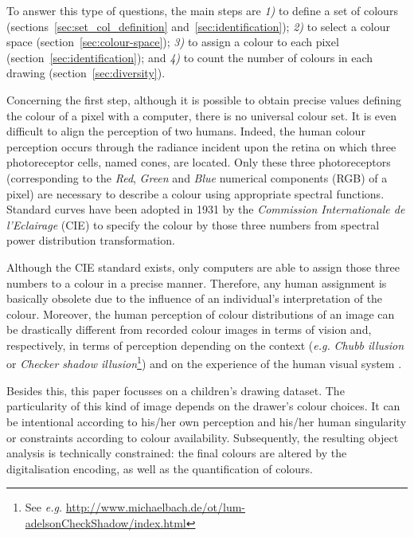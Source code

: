 \documentclass[11pt,a4paper]{article}
\begin{document}
To answer this type of questions, the main steps are \textit{1)} to define a set of colours 
(sections~\ref{sec:set_col_definition} and~\ref{sec:identification}); \textit{2)} to select a colour space (section~\ref{sec:colour-space}); \textit{3)} to assign a colour to each pixel (section~\ref{sec:identification}); and \textit{4)} to count the number of colours in each drawing (section~\ref{sec:diversity}).

Concerning the first step, although it is possible to obtain precise values defining the colour of a pixel with a computer, there is no universal colour set.
It is even difficult to align the perception of two humans.
Indeed, the human colour perception occurs through the radiance incident upon
the retina on which three photoreceptor cells, named cones, are located.
Only these three photoreceptors (corresponding to the \emph{Red}, \emph{Green} and \emph{Blue} numerical components (RGB) of a pixel) are necessary to describe a colour using appropriate spectral functions. Standard curves have been adopted in 1931 by the \textit{Commission Internationale de l'Eclairage} (CIE) to specify the colour by those three numbers from spectral power distribution transformation.

Although the CIE standard exists, only computers are able to assign
those three numbers to a colour in a precise manner. Therefore, any
human assignment is basically obsolete due to the influence of an
individual's interpretation of the colour. 
Moreover, the human perception of colour distributions of an image can be
drastically different from recorded colour images in terms of vision \cite[see \textit{e.g.}][]{jobson1997} and,
respectively, in terms of perception depending on the context (\textit{e.g.}
\emph{Chubb illusion}  \cite{ChubbSperlingSolomon1989} or \emph{Checker shadow illusion}\footnote{See \textit{e.g.} \url{http://www.michaelbach.de/ot/lum-adelsonCheckShadow/index.html}}) and on the experience of the human visual system \cite[see \textit{e.g.}][]{LottoPurves2001}.


Besides this, this paper focusses on a children's drawing dataset. 
The particularity of this kind of image depends on the drawer's
colour choices. It can be intentional according to his/her own
perception and his/her human singularity or constraints according to
colour availability. Subsequently, the resulting object analysis is
technically constrained: the final colours are altered by the
digitalisation encoding, as well as the quantification of colours.
\end{document}

